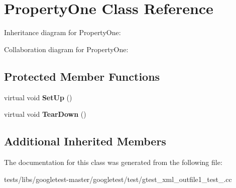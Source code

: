 \hypertarget{classPropertyOne}{}\section{Property\+One Class Reference}
\label{classPropertyOne}


Inheritance diagram for Property\+One\+:


Collaboration diagram for Property\+One\+:
\subsection*{Protected Member Functions}
\begin{DoxyCompactItemize}
\item 
\mbox{\label{classPropertyOne_a9cb7d7cb508d5f1a6fc7cfead81ebc2b}} 
virtual void {\bfseries Set\+Up} ()
\item 
\mbox{\label{classPropertyOne_a3ed895113848403d5ea27f52a1bb0545}} 
virtual void {\bfseries Tear\+Down} ()
\end{DoxyCompactItemize}
\subsection*{Additional Inherited Members}


The documentation for this class was generated from the following file\+:\begin{DoxyCompactItemize}
\item 
tests/libs/googletest-\/master/googletest/test/gtest\+\_\+xml\+\_\+outfile1\+\_\+test\+\_\+.\+cc\end{DoxyCompactItemize}
